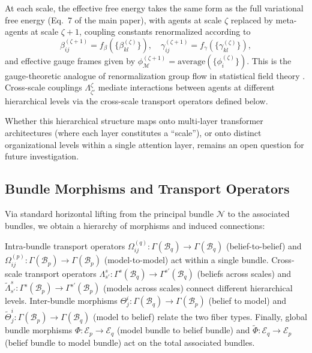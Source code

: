 \documentclass[twoside,11pt]{article}
\begin{document}
At each scale, the effective free energy takes the same form as the full variational free energy (Eq.~7 of the main paper), with agents at scale $\zeta$ replaced by meta-agents at scale $\zeta+1$, coupling constants renormalized according to
\begin{equation*}
  \beta_{ij}^{(\zeta+1)} = f_\beta(\{\beta_{kl}^{(\zeta)}\}), \quad
  \gamma_{ij}^{(\zeta+1)} = f_\gamma(\{\gamma_{kl}^{(\zeta)}\}),
\end{equation*}
and effective gauge frames given by $\phi_{\mathcal{M}}^{(\zeta+1)} = \text{average}(\{\phi_i^{(\zeta)}\})$.
This is the gauge-theoretic analogue of renormalization group flow in statistical field theory \citep{anderson1984basic,wilson1974renormalization,garciaMillan2024network}. Cross-scale couplings $\Lambda^{\zeta}_{\zeta'}$ mediate interactions between agents at different hierarchical levels via the cross-scale transport operators defined below.

Whether this hierarchical structure maps onto multi-layer transformer architectures (where each layer constitutes a ``scale''), or onto distinct organizational levels within a single attention layer, remains an open question for future investigation.

\subsection{Bundle Morphisms and Transport Operators}
Via standard horizontal lifting from the principal bundle $\mathcal{N}$ to the associated bundles, we obtain a hierarchy of morphisms and induced connections:

Intra-bundle transport operators $\Omega^{(q)}_{ij}: \Gamma(\mathcal{B}_q) \to \Gamma(\mathcal{B}_q)$ (belief-to-belief) and $\Omega^{(p)}_{ij}: \Gamma(\mathcal{B}_p) \to \Gamma(\mathcal{B}_p)$ (model-to-model) act within a single bundle. Cross-scale transport operators $\Lambda^{s}_{s'}: \Gamma^{s}(\mathcal{B}_q) \to \Gamma^{s'}(\mathcal{B}_q)$ (beliefs across scales) and $\tilde{\Lambda}^{s}_{s'}: \Gamma^{s}(\mathcal{B}_p) \to \Gamma^{s'}(\mathcal{B}_p)$ (models across scales) connect different hierarchical levels. Inter-bundle morphisms $\Theta^i_j: \Gamma(\mathcal{B}_q) \to \Gamma(\mathcal{B}_p)$ (belief to model) and $\tilde{\Theta}^i_j: \Gamma(\mathcal{B}_p) \to \Gamma(\mathcal{B}_q)$ (model to belief) relate the two fiber types. Finally, global bundle morphisms $\Phi: \mathcal{E}_p \to \mathcal{E}_q$ (model bundle to belief bundle) and $\tilde{\Phi}: \mathcal{E}_q \to \mathcal{E}_p$ (belief bundle to model bundle) act on the total associated bundles.
\end{document}
